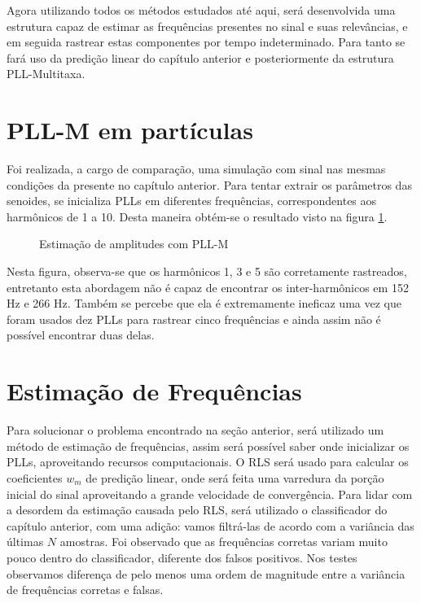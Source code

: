 

Agora utilizando todos os métodos estudados até aqui, será desenvolvida uma estrutura capaz de estimar as frequências presentes no sinal e suas relevâncias, e em seguida rastrear estas componentes por tempo indeterminado. Para tanto se fará uso da predição linear do capítulo anterior e posteriormente da estrutura PLL-Multitaxa. 

\section{PLL-M em partículas}

Foi realizada, a cargo de comparação, uma simulação com sinal nas mesmas condições da presente no capítulo anterior. Para tentar extrair os parâmetros das senoides, se inicializa PLLs em diferentes frequências, correspondentes aos harmônicos de 1 a 10. Desta maneira obtém-se o resultado visto na figura \ref{fig:pll_comp}.

\begin{figure}[H]
	\centering    
	\def\svgwidth{\columnwidth}
	
	\caption{Estimação de amplitudes com PLL-M}
	\label{fig:pll_comp}
\end{figure}

Nesta figura, observa-se que os harmônicos 1, 3 e 5 são corretamente rastreados, entretanto esta abordagem não é capaz de encontrar os inter-harmônicos em 152 Hz e 266 Hz. Também se percebe que ela é extremamente ineficaz uma vez que foram usados dez PLLs para rastrear cinco frequências e ainda assim não é possível encontrar duas delas.

\section{Estimação de Frequências}

Para solucionar o problema encontrado na seção anterior, será utilizado um método de estimação de frequências, assim será possível saber onde inicializar os PLLs, aproveitando recursos computacionais. O RLS será usado para calcular os coeficientes $w_m$ de predição linear, onde será feita uma varredura da porção inicial do sinal aproveitando a grande velocidade de convergência. Para lidar com a desordem da estimação causada pelo RLS, será utilizado o classificador do capítulo anterior, com uma adição: vamos filtrá-las de acordo com a variância das últimas $N$ amostras. Foi observado que as frequências corretas variam muito pouco dentro do classificador, diferente dos falsos positivos. Nos testes observamos diferença de pelo menos uma ordem de magnitude entre a variância de frequências corretas e falsas.

